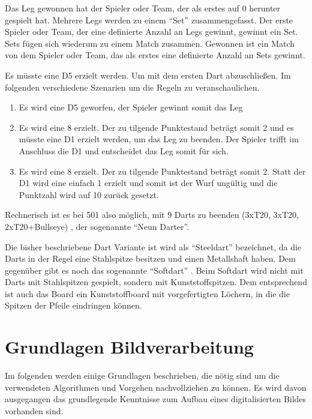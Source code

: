 Das Leg gewonnen hat der Spieler oder Team, der als erstes auf 0 herunter gespielt hat. Mehrere Legs werden zu einem "`Set"'  zusammengefasst. Der erste Spieler oder Team, der eine definierte Anzahl an Legs gewinnt, gewinnt ein Set. Sets fügen sich wiederum zu einem Match zusammen. Gewonnen ist ein Match von dem Spieler oder Team, das als erstes eine definierte Anzahl an Sets gewinnt.

\begin{example} 

Es müsste eine D5 erzielt werden. Um mit dem ersten Dart abzuschließen. Im folgenden verschiedene Szenarien um die Regeln zu veranschaulichen.
\begin{enumerate}
	\item Es wird eine D5 geworfen, der Spieler gewinnt somit das Leg
	\item Es wird eine 8 erzielt. Der zu tilgende Punktestand beträgt somit 2 und es müsste eine D1 erzielt werden, um das Leg zu beenden. Der Spieler trifft im Anschluss die D1 und entscheidet das Leg somit für sich. 
	\item Es wird eine 8 erzielt. Der zu tilgende Punktestand beträgt somit 2. Statt der D1 wird eine einfach 1 erzielt und somit ist der Wurf ungültig und die Punktzahl wird auf 10 zurück gesetzt.
\end{enumerate}
\end{example}

Rechnerisch ist es bei 501 also möglich, mit 9 Darts zu beenden (3xT20, 3xT20, 2xT20+Bullseye) , der sogenannte "`Neun Darter"'.

Die bisher beschriebene Dart Variante ist wird als "`Steeldart"' bezeichnet, da die Darts in der Regel eine Stahlspitze besitzen und einen Metallshaft haben. Dem gegenüber gibt es noch das sogenannte "`Softdart"' . Beim Softdart wird nicht mit Darts mit Stahlspitzen gespielt, sondern mit Kunststoffspitzen. Dem entsprechend ist auch das Board ein Kunststoffboard mit vorgefertigten Löchern, in die die Spitzen der Pfeile eindringen können. 

\section{Grundlagen Bildverarbeitung}
\label{sec:basics}
Im folgenden werden einige Grundlagen beschrieben, die nötig sind um die verwendeten Algorithmen und Vorgehen nachvollziehen zu können. Es wird davon ausgegangen das grundlegende Kenntnisse zum Aufbau eines digitalisierten Bildes vorhanden sind. 
